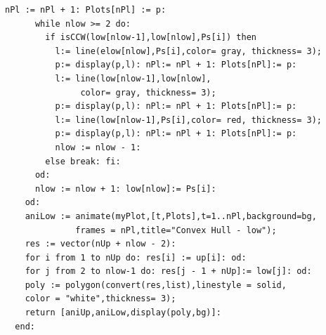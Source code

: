 \documentclass[12pt]{article}
\begin{document}
\begin{itemize}
\begin{Verbatim}[frame=single]
      nPl := nPl + 1: Plots[nPl] := p:
      while nlow >= 2 do:
        if isCCW(low[nlow-1],low[nlow],Ps[i]) then 
          l:= line(elow[nlow],Ps[i],color= gray, thickness= 3);
          p:= display(p,l): nPl:= nPl + 1: Plots[nPl]:= p:
          l:= line(low[nlow-1],low[nlow],
          	   color= gray, thickness= 3);
          p:= display(p,l): nPl:= nPl + 1: Plots[nPl]:= p:
          l:= line(low[nlow-1],Ps[i],color= red, thickness= 3);
          p:= display(p,l): nPl:= nPl + 1: Plots[nPl]:= p:
          nlow := nlow - 1:
        else break: fi:
      od:
      nlow := nlow + 1: low[nlow]:= Ps[i]:
    od:
    aniLow := animate(myPlot,[t,Plots],t=1..nPl,background=bg, 
              frames = nPl,title="Convex Hull - low");
    res := vector(nUp + nlow - 2):
    for i from 1 to nUp do: res[i] := up[i]: od:
    for j from 2 to nlow-1 do: res[j - 1 + nUp]:= low[j]: od:
    poly := polygon(convert(res,list),linestyle = solid, 
    color = "white",thickness= 3);
    return [aniUp,aniLow,display(poly,bg)]:
  end:
            \end{Verbatim}
            \newpage
        \end{itemize}
\end{document}
